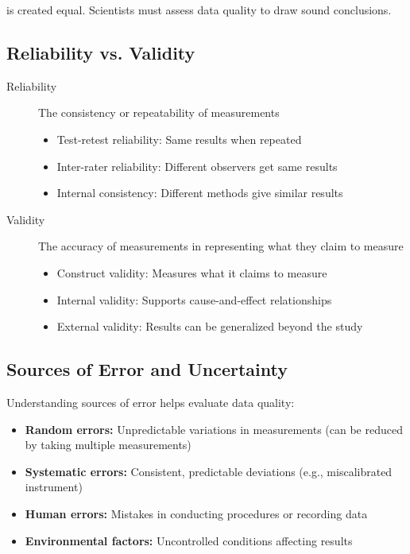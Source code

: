 \documentclass[justified,notoc]{tufte-book}
\newenvironment{keyconcept}[1]{%
    \begin{tcolorbox}[colback=primary!5,colframe=primary,title=\textbf{Key Concept: #1}]
}{%
    \end{tcolorbox}
}
\begin{document}
 is created equal. Scientists must assess data quality to draw sound conclusions.

\subsection{Reliability vs. Validity}

\begin{keyconcept}{Reliability and Validity}
\begin{description}
    \item[Reliability] The consistency or repeatability of measurements
    \begin{itemize}
        \item Test-retest reliability: Same results when repeated
        \item Inter-rater reliability: Different observers get same results
        \item Internal consistency: Different methods give similar results
    \end{itemize}
    
    \item[Validity] The accuracy of measurements in representing what they claim to measure
    \begin{itemize}
        \item Construct validity: Measures what it claims to measure
        \item Internal validity: Supports cause-and-effect relationships
        \item External validity: Results can be generalized beyond the study
    \end{itemize}
\end{description}
\end{keyconcept}

\subsection{Sources of Error and Uncertainty}

Understanding sources of error helps evaluate data quality:

\begin{itemize}
    \item \textbf{Random errors:} Unpredictable variations in measurements (can be reduced by taking multiple measurements)
    
    \item \textbf{Systematic errors:} Consistent, predictable deviations (e.g., miscalibrated instrument)
    
    \item \textbf{Human errors:} Mistakes in conducting procedures or recording data
    
    \item \textbf{Environmental factors:} Uncontrolled conditions affecting results
\end{itemize}
\end{document}
